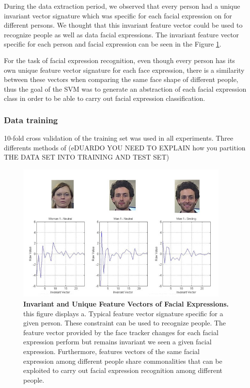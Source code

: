 \documentclass[]{article}
\begin{document}
During the data extraction period, we observed that every person had a unique invariant vector signature which was
specific for each facial expression on for different persons. We thought that this invariant feature vector could be
used to recognize people as well as data facial expressions. The invariant feature vector specific for each person and
facial expression can be seen in the Figure \ref{comparationBetweenFaces}.

For the task of facial expression recognition, even though every person has its own unique feature vector signature for
each face expression, there is a similarity between these vectors when comparing the same face shape of different
people, thus the goal of the SVM was to generate an abstraction of each facial expression class in order to be able to
carry out facial expression classification.

\subsubsection{Data training}
10-fold cross validation of the training set was used in all experiments. Three
differents methods of (eDUARDO YOU NEED TO EXPLAIN how you partition THE DATA
SET INTO TRAINING AND TEST SET)

\begin{figure}[ht]
\begin{center}
\vspace{-3mm}
\includegraphics[width=0.95\textwidth,height=70mm]{figures/comparationBetweenFaces.jpg}
\end{center}
\caption{\textbf{Invariant and Unique Feature Vectors of Facial Expressions.} this figure displays a. Typical feature 
vector signature specific for a given person. These constraint can be used to recognize people. The feature vector
provided by the face tracker changes for each facial expression perform but remains invariant we seen a given facial 
expression. Furthermore, features vectors of the same facial expression among different people share commonalities that
can be exploited to carry out facial expression recognition among different people.}
\label{comparationBetweenFaces}
\end{figure}
\end{document}
